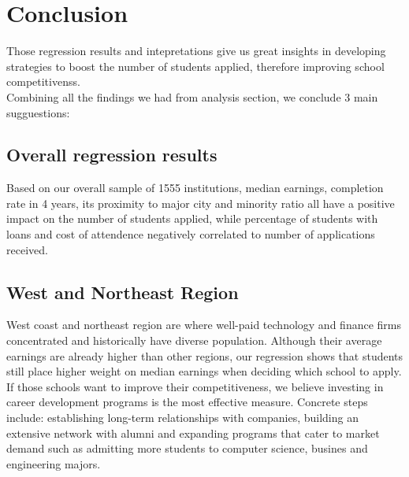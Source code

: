 \documentclass{article}
\begin{document}
\section{Conclusion}

Those regression results and intepretations give us great insights in developing strategies to boost the number of students applied, therefore improving school competitivenss. \\

Combining all the findings we had from analysis section, we conclude 3 main sugguestions:
\subsection{Overall regression results}
Based on our overall sample of 1555 institutions, median earnings, completion rate in 4 years, its proximity to major city and minority ratio all have a positive impact on the number of students applied, while percentage of students with loans and cost of attendence negatively correlated to number of applications received. 

\subsection{West and Northeast Region}
West coast and northeast region are where well-paid technology and finance firms concentrated and historically have diverse population. Although their average earnings are already higher than other regions, our regression shows that students still place higher weight on median earnings when deciding which school to apply. If those schools want to improve their competitiveness, we believe investing in career development programs is the most effective measure. Concrete steps include: establishing long-term relationships with companies, building an extensive network with alumni and expanding programs that cater to market demand such as admitting more students to computer science, busines and engineering majors. 
\end{document}
